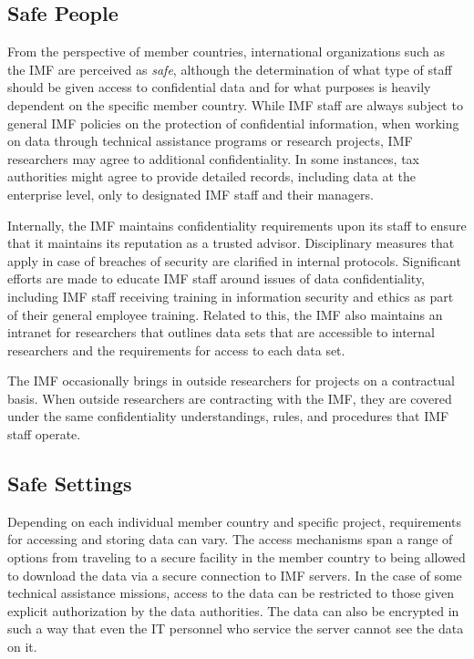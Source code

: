 \hypertarget{safe-people-7}{%
\subsection{Safe People}\label{safe-people-7}}

From the perspective of member countries, international organizations such as the IMF are perceived as \emph{safe}, although the determination of what type of staff should be given access to confidential data and for what purposes is heavily dependent on the specific member country. While IMF staff are always subject to general IMF policies on the protection of confidential information, when working on data through technical assistance programs or research projects, IMF researchers may agree to additional confidentiality. In some instances, tax authorities might agree to provide detailed records, including data at the enterprise level, only to designated IMF staff and their managers.

Internally, the IMF maintains confidentiality requirements upon its staff to ensure that it maintains its reputation as a trusted advisor. Disciplinary measures that apply in case of breaches of security are clarified in internal protocols. Significant efforts are made to educate IMF staff around issues of data confidentiality, including IMF staff receiving training in information security and ethics as part of their general employee training. Related to this, the IMF also maintains an intranet for researchers that outlines data sets that are accessible to internal researchers and the requirements for access to each data set.

The IMF occasionally brings in outside researchers for projects on a contractual basis. When outside researchers are contracting with the IMF, they are covered under the same confidentiality understandings, rules, and procedures that IMF staff operate.

\hypertarget{safe-settings-7}{%
\subsection{Safe Settings}\label{safe-settings-7}}

Depending on each individual member country and specific project, requirements for accessing and storing data can vary. The access mechanisms span a range of options from traveling to a secure facility in the member country to being allowed to download the data via a secure connection to IMF servers. In the case of some technical assistance missions, access to the data can be restricted to those given explicit authorization by the data authorities. The data can also be encrypted in such a way that even the IT personnel who service the server cannot see the data on it.

